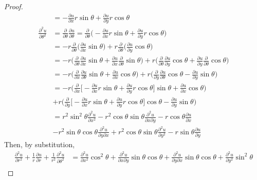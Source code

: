 \documentclass[12pt]{article}
\begin{document}
\begin{enumerate}
\begin{proof}
\begin{align*}
&= -\frac{\partial u}{\partial x}r\sin \theta + \frac{\partial u}{\partial y} r\cos \theta  \\
\frac{\partial^2 u}{\partial \theta^2}&=\frac{\partial}{\partial \theta}\frac{\partial u}{\partial \theta} = \frac{\partial }{\partial \theta}\Big(-\frac{\partial u}{\partial x}r\sin\theta + \frac{\partial u}{\partial y} r\cos \theta\Big)  \\
&= -r \frac{\partial}{\partial \theta}\Big(\frac{\partial u}{\partial x}\sin\theta \Big) + r \frac{\partial}{\partial \theta}\Big(\frac{\partial u}{\partial y}\cos\theta \Big)  \\
&= -r\Big(\frac{\partial}{\partial \theta}\frac{\partial u}{\partial x}\sin \theta + \frac{\partial u}{\partial x}\frac{\partial}{\partial \theta}\sin \theta \Big) + r\Big(\frac{\partial}{\partial \theta}\frac{\partial u}{\partial y}\cos \theta + \frac{\partial u}{\partial y}\frac{\partial}{\partial \theta}\cos \theta \Big)  \\
&= -r\Big(\frac{\partial}{\partial x}\frac{\partial u}{\partial \theta}\sin \theta + \frac{\partial u}{\partial x}\cos \theta \Big) + r\Big(\frac{\partial}{\partial y}\frac{\partial u}{\partial \theta}\cos \theta - \frac{\partial u}{\partial y}\sin \theta \Big)  \\
&= -r\Big(\frac{\partial}{\partial x}\Big[-\frac{\partial u}{\partial x}r\sin \theta + \frac{\partial u}{\partial y} r\cos \theta\Big]\sin \theta + \frac{\partial u}{\partial x}\cos \theta \Big) \\ &+ r\Big(\frac{\partial}{\partial y}\Big[-\frac{\partial u}{\partial x}r\sin \theta
+ \frac{\partial u}{\partial y} r\cos \theta\Big]\cos \theta - \frac{\partial u}{\partial y}\sin \theta \Big) \\
&= r^2\sin^2\theta \frac{\partial^2 u}{\partial x^2} - r^2 \cos \theta \sin \theta \frac{\partial^2 u}{\partial x \partial y} - r\cos\theta \frac{\partial u}{\partial x} \\ &-r^2\sin\theta\cos\theta \frac{\partial^2 u}{\partial y \partial x} + r^2 \cos \theta \sin \theta \frac{\partial^2 u}{\partial y^2} - r\sin\theta \frac{\partial u}{\partial y} 
\end{align*}
Then, by substitution,
\begin{align*}
\frac{\partial^2 u}{\partial r^2} + \frac{1}{r}\frac{\partial u}{\partial r} + \frac{1}{r^2} \frac{\partial^2 u}{\partial \theta^2} &= \frac{\partial^2 u}{\partial x^2}\cos^2 \theta + \frac{\partial^2 u}{\partial x \partial y}\sin \theta \cos \theta + \frac{\partial^2 u}{\partial y \partial x}\sin \theta \cos \theta + \frac{\partial^2 u}{\partial y^2}\sin^2 \theta \\

\end{align*}
\end{proof}
\end{enumerate}
\end{document}
